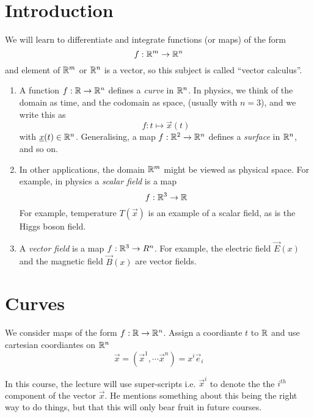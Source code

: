 \documentclass{article}
\numberwithin{equation}{section}
\begin{document}

\section*{Introduction}
We will learn to differentiate and integrate functions (or maps) of the form
\[f : \mathbb{R}^m \rightarrow \mathbb{R}^n\]
and element of $\mathbb{R}^m$ or $\mathbb{R}^n$ is a vector, so this subject is called ``vector calculus''.

\begin{eg}[Maps]\leavevmode
    \begin{enumerate}
        \item A function $f: \mathbb{R} \rightarrow \mathbb{R}^n$ defines a \emph{curve} in $\mathbb{R}^n$.
        In physics, we think of the domain as time, and the codomain as space, (usually with $n = 3$), and we write this as
        \[ f: t \mapsto \vec x(t)\] 
        with $\underline{x}(t) \in \mathbb{R}^n$. Generalising, a map $f: \mathbb{R}^2 \rightarrow \mathbb{R}^n$ defines a \emph{surface} in $\mathbb{R}^n$, and so on.

        \item In other applications, the domain $\mathbb{R}^m$ might be viewed as physical space. 
        For example, in physics a \emph{scalar field} is a map
        \[f: \mathbb{R}^3 \rightarrow \mathbb{R}\]
        For example, temperature $T(\vec x)$ is an example of a scalar field, as is the Higgs boson field.
        
        \item A \emph{vector field} is a map $f: \mathbb{R}^3 \rightarrow R^n$.
        For example, the electric field $\vec E(x)$ and the magnetic field $\vec B(x)$ are vector fields. 
    \end{enumerate}
\end{eg}

\section{Curves}
We consider maps of the form $f: \mathbb{R} \rightarrow \mathbb{R}^n$. 
Assign a coordiante $t$ to $\mathbb{R}$ and use cartesian coordiantes on $\mathbb{R}^n$
\[ \vec x = (\vec x^1, \cdots \vec x^n) = x^i \vec e_i \tag{summation notation over $i$}\]

\begin{notation}
In this course, the lecture will use super-scripts i.e. $\vec x^i$ to denote the the $i^{th}$ component of the vector $\vec x$.
He mentions something about this being the right way to do things, but that this will only bear fruit in future courses.
\end{notation}
\end{document}
